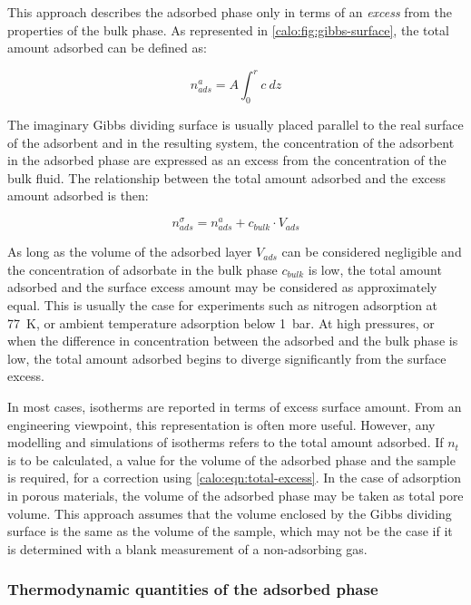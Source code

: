 This approach describes the adsorbed phase only in terms
of an \textit{excess} from the properties of the bulk phase.
As represented in \autoref{calo:fig:gibbs-surface}, the total
amount adsorbed can be defined as:

\begin{equation}
	n_{ads}^{a} = A \int_0^r c\ dz
\end{equation}

The imaginary Gibbs dividing surface is usually placed parallel to
the real surface of the adsorbent and in the resulting system, the
concentration of the adsorbent in the adsorbed phase are
expressed as an excess from the concentration of the bulk fluid.
The relationship between the total amount adsorbed and the
excess amount adsorbed is then:

\begin{equation}\label{calo:eqn:total-excess}
	n_{ads}^{\sigma} = n_{ads}^{a} +  c_{bulk} \cdot V_{ads}
\end{equation}

As long as the volume of the adsorbed layer \(V_{ads}\) can be
considered negligible and the concentration of adsorbate in the bulk
phase \(c_{bulk}\) is low, the total amount adsorbed and the surface
excess amount may be considered as approximately equal.
This is usually the case for experiments such as nitrogen
adsorption at \SI{77}{\kelvin}, or ambient temperature adsorption
below \SI{1}{\bar}.
At high pressures, or when the difference in concentration between
the adsorbed and the bulk phase is low, the total amount adsorbed
begins to diverge significantly from the surface excess.

In most cases, isotherms are reported in terms of excess surface 
amount. From an engineering viewpoint, this representation
is often more useful. However, any modelling and simulations of 
isotherms refers to the total amount adsorbed.
If \(n_t\) is to be calculated, a value
for the volume of the adsorbed phase and the sample is required, for a 
correction using \autoref{calo:eqn:total-excess}.
In the case of adsorption in porous materials, the volume of the
adsorbed phase may be taken as total pore volume. This approach
assumes that the volume enclosed by the Gibbs dividing surface is
the same as the volume of the sample, which may not be the case 
if it is determined with a blank measurement of a 
non-adsorbing gas.

\subsubsection{Thermodynamic quantities of the adsorbed phase}

